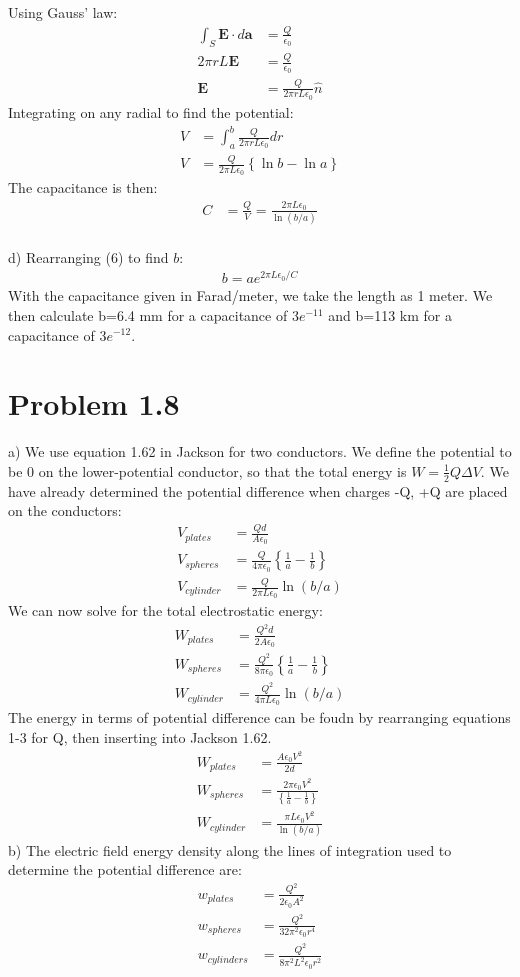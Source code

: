 \documentclass[a4paper,11pt]{article}
\numberwithin{equation}{section}
\newcommand{\bv}[1]{\mathbf{#1}}
\newcommand{\ez}{\epsilon_0}
\newcommand{\lrp}[1]{\left({#1}\right)}
\newcommand{\lrb}[1]{\left\{{#1}\right\}}
\begin{document}
Using Gauss' law:
\begin{align}
 \int_S \bv{E}\cdot d\bv{a} &= \frac{Q}{\ez}\\
 2\pi r L \bv{E} &= \frac{Q}{\ez}\\
 \bv{E} &= \frac{Q}{2\pi r L\ez} \hat{n}
\end{align}
Integrating on any radial to find the potential:
\begin{align}
 V &= \int_a^b \frac{Q}{2\pi r L\ez} dr\\
 V &= \frac{Q}{2\pi L\ez} \lrb{\ln{b}-\ln{a}}
\end{align}
The capacitance is then:
\begin{align}
 C &= \frac{Q}{V} = \frac{2\pi L\ez}{\ln{(b/a)}}
\end{align}
\\
d) Rearranging (6) to find $b$:
\begin{align}
 b = a e^{2\pi L\ez /C}
\end{align}
With the capacitance given in Farad/meter, we take the length as 1 meter. 
We then calculate b=6.4 mm for a capacitance of $3e^{-11}$ and b=113 km for a capacitance of $3e^{-12}$. 

\section{Problem 1.8}
a) We use equation 1.62 in Jackson for two conductors. 
We define the potential to be 0 on the lower-potential conductor, so that the total energy is $W=\frac{1}{2}Q\Delta V$.
We have already determined the potential difference when charges -Q, +Q are placed on the conductors:
\begin{align} 
 V_{plates} &= \frac{Qd}{A\ez}\\
 V_{spheres} &= \frac{Q}{4\pi\ez}\lrb{\frac{1}{a}-\frac{1}{b}}\\
 V_{cylinder} &= \frac{Q}{2\pi L\ez}\ln{\lrp{b/a}}
\end{align}
We can now solve for the total electrostatic energy:
\begin{align}
 W_{plates} &= \frac{Q^2d}{2A\ez}\\
 W_{spheres} &= \frac{Q^2}{8\pi\ez}\lrb{\frac{1}{a}-\frac{1}{b}}\\
 W_{cylinder} &= \frac{Q^2}{4\pi L\ez}\ln{\lrp{b/a}}
\end{align}
The energy in terms of potential difference can be foudn by rearranging equations 1-3 for Q, then inserting into Jackson 1.62.
\begin{align}
 W_{plates} &= \frac{A\ez V^2}{2d}\\
 W_{spheres} &= \frac{2\pi\ez V^2}{\lrb{\frac{1}{a}-\frac{1}{b}}}\\
 W_{cylinder} &= \frac{\pi L \ez V^2}{\ln{\lrp{b/a}}}
\end{align}
b) The electric field energy density along the lines of integration used to determine the potential difference are:
\begin{align}
 w_{plates} &= \frac{Q^2}{2\ez A^2}\\
 w_{spheres} &= \frac{Q^2}{32\pi^2\ez r^4}\\
 w_{cylinders} &= \frac{Q^2}{8\pi^2L^2\ez r^2}
\end{align}
\end{document}
